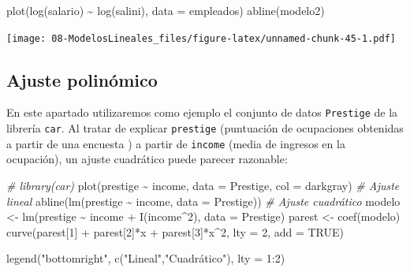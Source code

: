 \documentclass[
]{book}
\newenvironment{Shaded}{\begin{snugshade}}{\end{snugshade}}
\newcommand{\AttributeTok}[1]{\textcolor[rgb]{0.77,0.63,0.00}{#1}}
\newcommand{\CommentTok}[1]{\textcolor[rgb]{0.56,0.35,0.01}{\textit{#1}}}
\newcommand{\ConstantTok}[1]{\textcolor[rgb]{0.00,0.00,0.00}{#1}}
\newcommand{\DecValTok}[1]{\textcolor[rgb]{0.00,0.00,0.81}{#1}}
\newcommand{\FunctionTok}[1]{\textcolor[rgb]{0.00,0.00,0.00}{#1}}
\newcommand{\NormalTok}[1]{#1}
\newcommand{\OtherTok}[1]{\textcolor[rgb]{0.56,0.35,0.01}{#1}}
\newcommand{\SpecialCharTok}[1]{\textcolor[rgb]{0.00,0.00,0.00}{#1}}
\newcommand{\StringTok}[1]{\textcolor[rgb]{0.31,0.60,0.02}{#1}}
\theoremstyle{break}
\theoremstyle{nonumberplain}
\begin{document}
\begin{Shaded}
\begin{Highlighting}[]
\FunctionTok{plot}\NormalTok{(}\FunctionTok{log}\NormalTok{(salario) }\SpecialCharTok{\textasciitilde{}} \FunctionTok{log}\NormalTok{(salini), }\AttributeTok{data =}\NormalTok{ empleados)}
\FunctionTok{abline}\NormalTok{(modelo2)}
\end{Highlighting}
\end{Shaded}

\texttt{[image: 08-ModelosLineales\_files/figure-latex/unnamed-chunk-45-1.pdf]}

\hypertarget{ajuste-polinuxf3mico}{%
\subsection{Ajuste polinómico}\label{ajuste-polinuxf3mico}}

En este apartado utilizaremos como ejemplo el conjunto de datos \texttt{Prestige} de la librería \texttt{car}. Al tratar de explicar \texttt{prestige} (puntuación de ocupaciones obtenidas a partir de una encuesta ) a partir de \texttt{income} (media de ingresos en la ocupación), un ajuste cuadrático puede parecer razonable:

\begin{Shaded}
\begin{Highlighting}[]
\CommentTok{\# library(car)}
\FunctionTok{plot}\NormalTok{(prestige }\SpecialCharTok{\textasciitilde{}}\NormalTok{ income, }\AttributeTok{data =}\NormalTok{ Prestige, }\AttributeTok{col =} \StringTok{\textquotesingle{}darkgray\textquotesingle{}}\NormalTok{)}
\CommentTok{\# Ajuste lineal}
\FunctionTok{abline}\NormalTok{(}\FunctionTok{lm}\NormalTok{(prestige }\SpecialCharTok{\textasciitilde{}}\NormalTok{ income, }\AttributeTok{data =}\NormalTok{ Prestige)) }
\CommentTok{\# Ajuste cuadrático}
\NormalTok{modelo }\OtherTok{\textless{}{-}} \FunctionTok{lm}\NormalTok{(prestige }\SpecialCharTok{\textasciitilde{}}\NormalTok{ income }\SpecialCharTok{+} \FunctionTok{I}\NormalTok{(income}\SpecialCharTok{\^{}}\DecValTok{2}\NormalTok{), }\AttributeTok{data =}\NormalTok{ Prestige)}
\NormalTok{parest }\OtherTok{\textless{}{-}} \FunctionTok{coef}\NormalTok{(modelo)}
\FunctionTok{curve}\NormalTok{(parest[}\DecValTok{1}\NormalTok{] }\SpecialCharTok{+}\NormalTok{ parest[}\DecValTok{2}\NormalTok{]}\SpecialCharTok{*}\NormalTok{x }\SpecialCharTok{+}\NormalTok{ parest[}\DecValTok{3}\NormalTok{]}\SpecialCharTok{*}\NormalTok{x}\SpecialCharTok{\^{}}\DecValTok{2}\NormalTok{, }\AttributeTok{lty =} \DecValTok{2}\NormalTok{, }\AttributeTok{add =} \ConstantTok{TRUE}\NormalTok{)}

\FunctionTok{legend}\NormalTok{(}\StringTok{"bottomright"}\NormalTok{, }\FunctionTok{c}\NormalTok{(}\StringTok{"Lineal"}\NormalTok{,}\StringTok{"Cuadrático"}\NormalTok{), }\AttributeTok{lty =} \DecValTok{1}\SpecialCharTok{:}\DecValTok{2}\NormalTok{)}
\end{Highlighting}
\end{Shaded}
\end{document}
